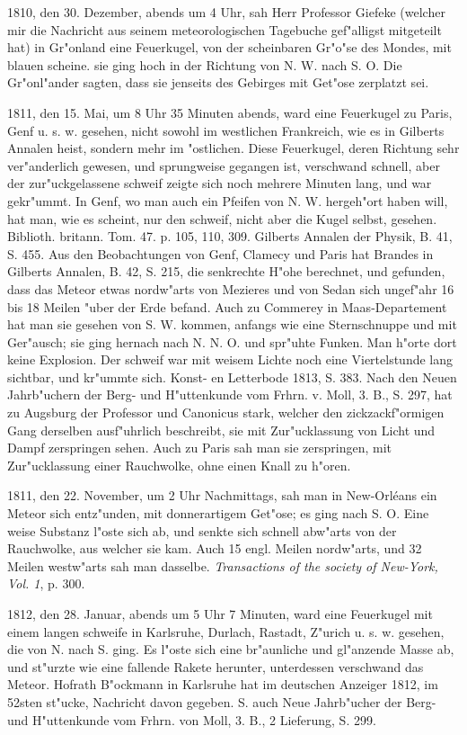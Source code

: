 \documentclass[a4paper, 11pt, oneside, polutonikogreek, german]{article}
\begin{document}
1810, den 30. Dezember, abends um 4 Uhr, sah Herr Professor Giefeke (welcher mir die Nachricht aus seinem meteorologischen Tagebuche gef"alligst mitgeteilt hat) in Gr"onland eine Feuerkugel, von der scheinbaren Gr"o"se des Mondes, mit blauen scheine. sie ging hoch in der Richtung von N. W. nach S. O. Die Gr"onl"ander sagten, dass sie jenseits des Gebirges mit Get"ose zerplatzt sei.

1811, den 15. Mai, um 8 Uhr 35 Minuten abends, ward eine Feuerkugel zu Paris, Genf u. s. w. gesehen, nicht sowohl im westlichen Frankreich, wie es in Gilberts Annalen heist, sondern mehr im "ostlichen. Diese Feuerkugel, deren Richtung sehr ver"anderlich gewesen, und sprungweise gegangen ist, verschwand schnell, aber der zur"uckgelassene schweif zeigte sich noch mehrere Minuten lang, und war gekr"ummt. In Genf, wo man auch ein Pfeifen von N. W. hergeh"ort haben will, hat man, wie es scheint, nur den schweif, nicht aber die Kugel selbst, gesehen. Biblioth. britann. Tom. 47. p. 105, 110, 309. Gilberts Annalen der Physik, B. 41, S. 455. Aus den Beobachtungen von Genf, Clamecy und Paris hat Brandes in Gilberts Annalen, B. 42, S. 215, die senkrechte H"ohe berechnet, und gefunden, dass das Meteor etwas nordw"arts von Mezieres und von Sedan sich ungef"ahr 16 bis 18 Meilen "uber der Erde befand. Auch zu Commerey in Maas-Departement hat man sie gesehen von S. W. kommen, anfangs wie eine Sternschnuppe und mit Ger"ausch; sie ging hernach nach N. N. O. und spr"uhte Funken. Man h"orte dort keine Explosion. Der schweif war mit weisem Lichte noch eine Viertelstunde lang sichtbar, und kr"ummte sich. Konst- en Letterbode 1813, S. 383. Nach den Neuen Jahrb"uchern der Berg- und H"uttenkunde vom Frhrn. v. Moll, 3. B., S. 297, hat zu Augsburg der Professor und Canonicus stark, welcher den zickzackf"ormigen Gang derselben ausf"uhrlich beschreibt, sie mit Zur"ucklassung von Licht und Dampf zerspringen sehen. Auch zu Paris sah man sie zerspringen, mit Zur"ucklassung einer Rauchwolke, ohne einen Knall zu h"oren.

1811, den 22. November, um 2 Uhr Nachmittags, sah man in New-Orléans ein Meteor sich entz"unden, mit donnerartigem Get"ose; es ging nach S. O. Eine weise Substanz l"oste sich ab, und senkte sich schnell abw"arts von der Rauchwolke, aus welcher sie kam. Auch 15 engl. Meilen nordw"arts, und 32 Meilen westw"arts sah man dasselbe. \emph{Transactions of the society of New-York, Vol. 1}, p. 300.

1812, den 28. Januar, abends um 5 Uhr 7 Minuten, ward eine Feuerkugel mit einem langen schweife in Karlsruhe, Durlach, Rastadt, Z"urich u. s. w. gesehen, die von N. nach S. ging. Es l"oste sich eine br"aunliche und gl"anzende Masse ab, und st"urzte wie eine fallende Rakete herunter, unterdessen verschwand das Meteor. Hofrath B"ockmann in Karlsruhe hat im deutschen Anzeiger 1812, im 52sten st"ucke, Nachricht davon gegeben. S. auch Neue Jahrb"ucher der Berg- und H"uttenkunde vom Frhrn. von Moll, 3. B., 2 Lieferung, S. 299.
\end{document}
